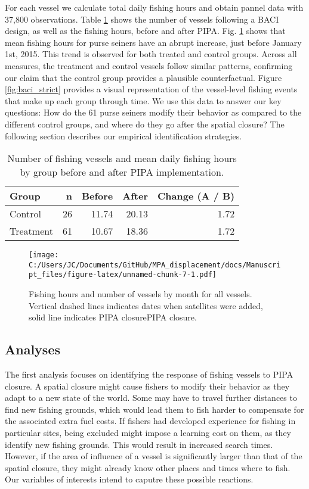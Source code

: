 \documentclass[11pt,]{article}
\begin{document}
For each vessel we calculate total daily fishing hours and obtain pannel
data with 37,800 observations. Table \ref{tab:baci_n_s} shows the number
of vessels following a BACI design, as well as the fishing hours, before
and after PIPA. Fig. \ref{fig:all_vessels} shows that mean fishing hours
for purse seiners have an abrupt increase, just before January 1st,
2015. This trend is observed for both treated and control groups. Across
all measures, the treatment and control vessels follow similar patterns,
confirming our claim that the control group provides a plausible
counterfactual. Figure \ref{fig:baci_strict} provides a visual
representation of the vessel-level fishing events that make up each
group through time. We use this data to answer our key questions: How do
the 61 purse seiners modify their behavior as compared to the different
control groups, and where do they go after the spatial closure? The
following section describes our empirical identification strategies.

\begin{table}[H]

\caption{\label{tab:unnamed-chunk-6}\label{tab:baci_n_s}Number of fishing vessels and mean daily fishing hours by group before and after PIPA implementation.}
\centering
\begin{tabular}[t]{lrrrr}
\toprule
Group & n & Before & After & Change (A / B)\\
\midrule
Control & 26 & 11.74 & 20.13 & 1.72\\
Treatment & 61 & 10.67 & 18.36 & 1.72\\
\bottomrule
\end{tabular}
\end{table}

\begin{figure}
\centering
\texttt{[image: C:/Users/JC/Documents/GitHub/MPA\_displacement/docs/Manuscript\_files/figure-latex/unnamed-chunk-7-1.pdf]}
\caption{\label{fig:unnamed-chunk-7}\label{fig:all_vessels}Fishing hours and
number of vessels by month for all vessels. Vertical dashed lines
indicates dates when satellites were added, solid line indicates PIPA
closurePIPA closure.}
\end{figure}

\hypertarget{analyses}{%
\subsection{Analyses}\label{analyses}}

The first analysis focuses on identifying the response of fishing
vessels to PIPA closure. A spatial closure might cause fishers to modify
their behavior as they adapt to a new state of the world. Some may have
to travel further distances to find new fishing grounds, which would
lead them to fish harder to compensate for the associated extra fuel
costs. If fishers had developed experience for fishing in particular
sites, being excluded might impose a learning cost on them, as they
identify new fishing grounds. This would result in increased search
times. However, if the area of influence of a vessel is significantly
larger than that of the spatial closure, they might already know other
places and times where to fish. Our variables of interests intend to
caputre these possible reactions.
\end{document}
